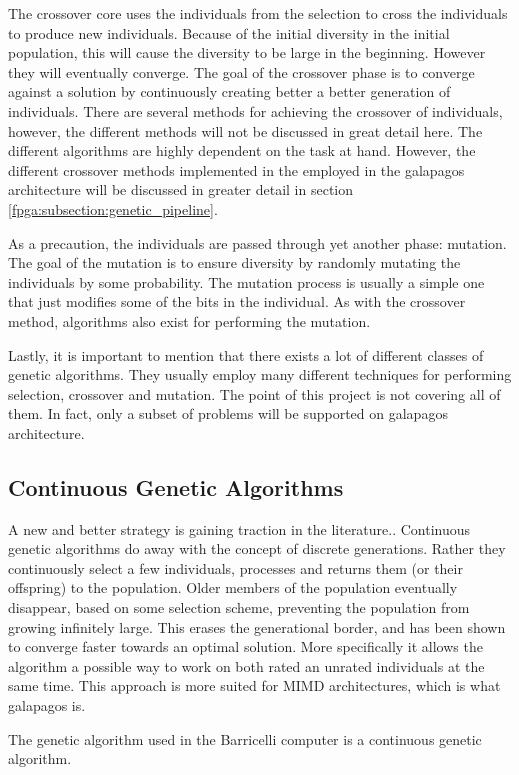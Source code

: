 The crossover core uses the individuals from the selection to cross the individuals to produce new individuals.
Because of the initial diversity in the initial population, this will cause the diversity to be large in the beginning.
However they will eventually converge.
The goal of the crossover phase is to converge against a solution by continuously creating better a better generation of individuals.
There are several methods for achieving the crossover of individuals, however, the different methods will not be discussed in great detail here.
The different algorithms are highly dependent on the task at hand.
However, the different crossover methods implemented in the employed in the galapagos architecture will be discussed in greater detail in section \vref{fpga:subsection:genetic_pipeline}.

As a precaution, the individuals are passed through yet another phase: mutation.
The goal of the mutation is to ensure diversity by randomly mutating the individuals by some probability.
The mutation process is usually a simple one that just modifies some of the bits in the individual.
As with the crossover method, algorithms also exist for performing the mutation.


Lastly, it is important to mention that there exists a lot of different classes of genetic algorithms.
They usually employ many different techniques for performing selection, crossover and mutation.
The point of this project is not covering all of them.
In fact, only a subset of problems will be supported on galapagos architecture.




\subsection{Continuous Genetic Algorithms}
A new and better strategy is gaining traction in the literature..
Continuous genetic algorithms do away with the concept of discrete generations.
Rather they continuously select a few individuals, processes and returns them (or their offspring) to the population.
Older members of the population eventually disappear, based on some selection scheme, preventing the population from growing infinitely large.
This erases the generational border, and has been shown to converge faster towards an optimal solution.
More specifically it allows the algorithm a possible way to work on both rated an unrated individuals at the same time.
This approach is more suited for MIMD architectures, which is what galapagos is.

The genetic algorithm used in the Barricelli computer is a continuous genetic algorithm.


